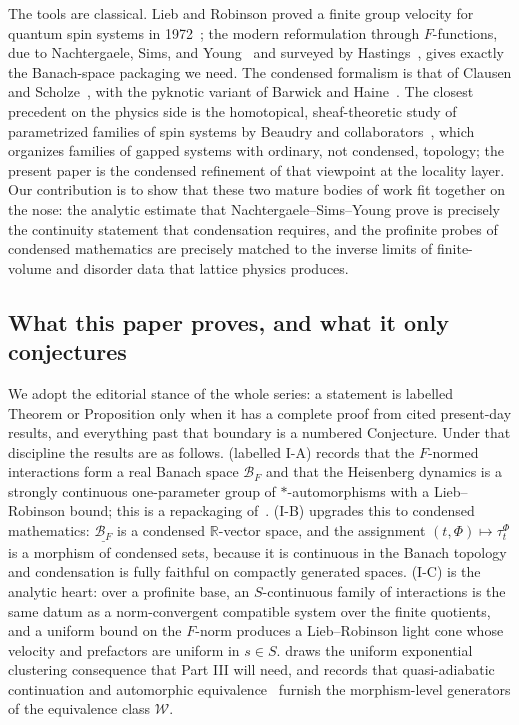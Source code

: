 \documentclass[12pt]{article}
\newcommand{\cond}[1]{\underline{#1}}          %
\newcommand{\Ffun}{F}                          %
\newcommand{\BF}{\mathcal{B}_{F}}              %
\newcommand{\Weq}{\mathcal{W}}                 %
\newcommand{\R}{\mathbb{R}}
\theoremstyle{definition}
\theoremstyle{remark}
\begin{document}
The tools are classical. Lieb and Robinson proved a finite group velocity for quantum spin
systems in 1972~\cite{lieb-robinson-1972}; the modern reformulation through
$\Ffun$-functions, due to Nachtergaele, Sims, and Young~\cite{nsy-quasilocality-1,
nsy-quasilocality-2} and surveyed by Hastings~\cite{hastings-locality}, gives exactly the
Banach-space packaging we need. The condensed formalism is that of Clausen and
Scholze~\cite{clausen-scholze-condensed, clausen-scholze-analytic,
clausen-scholze-analytic-stacks}, with the pyknotic variant of Barwick and
Haine~\cite{barwick-haine-pyknotic}. The closest precedent on the physics side is the
homotopical, sheaf-theoretic study of parametrized families of spin systems by Beaudry and
collaborators~\cite{beaudry-etal}, which organizes families of gapped systems with
ordinary, not condensed, topology; the present paper is the condensed refinement of that
viewpoint at the locality layer. Our contribution is to show that these two mature bodies
of work fit together on the nose: the analytic estimate that Nachtergaele--Sims--Young prove
is precisely the continuity statement that condensation requires, and the profinite probes of
condensed mathematics are precisely matched to the inverse limits of finite-volume and
disorder data that lattice physics produces.

\subsection{What this paper proves, and what it only conjectures}
\label{sec:intro-results}

We adopt the editorial stance of the whole series: a statement is labelled
Theorem or Proposition only when it has a complete proof from cited present-day results, and
everything past that boundary is a numbered Conjecture. Under that discipline the results are
as follows.  (labelled I-A) records that the $\Ffun$-normed interactions
form a real Banach space $\BF$ and that the Heisenberg dynamics is a strongly continuous
one-parameter group of $*$-automorphisms with a Lieb--Robinson bound; this is a repackaging
of~\cite{nsy-quasilocality-1}.  (I-B) upgrades this to condensed
mathematics: $\cond{\BF}$ is a condensed $\R$-vector space, and the assignment
$(t,\Phi)\mapsto\tau^\Phi_t$ is a morphism of condensed sets, because it is continuous in the
Banach topology and condensation is fully faithful on compactly generated spaces. 
(I-C) is the analytic heart: over a profinite base, an $S$-continuous family of interactions
is the same datum as a norm-convergent compatible system over the finite quotients, and a
uniform bound on the $\Ffun$-norm produces a Lieb--Robinson light cone whose velocity and
prefactors are uniform in $s\in S$.  draws the uniform exponential
clustering consequence that Part III will need, and  records that
quasi-adiabatic continuation and automorphic equivalence~\cite{hastings-wen-qac,
bmns-automorphic} furnish the morphism-level generators of the equivalence class $\Weq$.
\end{document}
